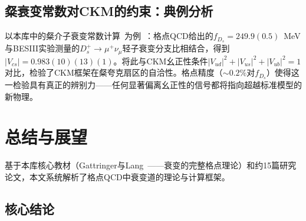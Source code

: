 \documentclass[12pt,a4paper]{ctexart}
\theoremstyle{definition}
\begin{document}
\subsection{粲衰变常数对CKM的约束：典例分析}

以本库中的粲介子衰变常数计算~\cite{CharmedClover}为例~\cite{CharmedClover}：格点QCD给出的$f_{D_s} = 249.9(0.5)$~MeV与BESIII实验测量的$D_s^+\to\mu^+\nu_\mu$轻子衰变分支比相结合，得到$|V_{cs}| = 0.983(10)(13)(1)$。将此与CKM幺正性条件$|V_{ud}|^2 + |V_{us}|^2 + |V_{ub}|^2 = 1$对比，检验了CKM框架在粲夸克扇区的自洽性。格点精度（$\sim 0.2\%$对$f_{D_s}$）使得这一检验具有真正的辨别力——任何显著偏离幺正性的信号都将指向超越标准模型的新物理。

\section{总结与展望}

基于本库核心教材（Gattringer与Lang~\cite{GattringerLang2010}——衰变的完整格点理论）和约15篇研究论文，本文系统解析了格点QCD中衰变道的理论与计算框架。

\subsection*{核心结论}
\end{document}
